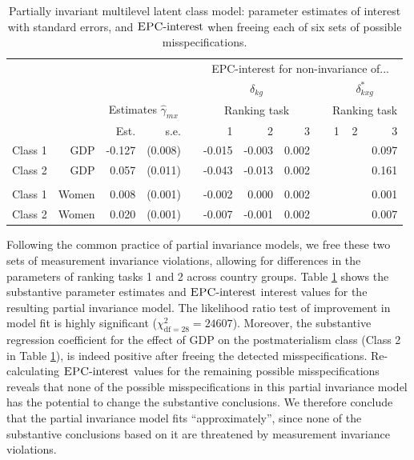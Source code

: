 \documentclass[letterpaper,12pt]{article}
\newcommand{\da}{\textrm{{\sc {EPC}}-interest}}
\begin{document}
\begin{table}\begin{small}
	\caption{
	Partially invariant  multilevel latent class model: parameter estimates of interest with standard errors, and  $\da{}$ when freeing each of six sets of possible misspecifications. 
	\label{tab:epc-interest-model2}}
	\begin{tabular}{lrrrrrrrrrrr}
	\hline
		&&&&&\multicolumn{7}{c}{EPC-interest for non-invariance of...}\\
	&&&&&\multicolumn{3}{c}{$\delta_{k g}$} && \multicolumn{3}{c}{$\delta^{*}_{k x g}$}\\
			\hline
		&&\multicolumn{2}{c}{Estimates $\hat{\gamma}_{mx}$}&&\multicolumn{3}{c}{Ranking task} && \multicolumn{3}{c}{Ranking task}\\
\cline{3-4}\cline{6-8}\cline{10-12}
			&	&	Est.&	s.e.&	&	1  &	2  &	3  &&	  1&	2 &	3\\
				\hline
Class 1&	GDP&	-0.127&	(0.008)&	&	-0.015&	-0.003&	0.002&&	&	&	0.097\\
Class 2&	GDP&	0.057&	(0.011)&	&	-0.043&	-0.013&	0.002&&	&	&	0.161\\
\\
Class 	1&	Women&	0.008&	(0.001)&	&	-0.002&	0.000&	0.002&	&&	&	0.001\\
Class 	2&	Women&	0.020&	(0.001)&	&	-0.007&	-0.001&	0.002&	&&	&	0.007\\
\hline
	\end{tabular}
\end{small}\end{table}

Following the common practice of partial invariance models, we free these two sets of measurement invariance violations, allowing for differences in the parameters of ranking tasks 1 and 2 across country groups. Table \ref{tab:epc-interest-model2} shows the substantive parameter estimates and $\da{}$ interest values for the resulting partial invariance model. The likelihood ratio test of improvement in model fit is highly significant ($\chi^2_{\text{df} = 28} = 24607$). Moreover, the substantive  regression coefficient for the effect of GDP on the postmaterialism class (Class 2 in Table \ref{tab:epc-interest-model2}), is indeed positive after freeing the detected misspecifications. Re-calculating $\da{}$ values for the remaining possible misspecifications reveals that none of the possible misspecifications in this partial invariance model has the potential to change the substantive conclusions. We therefore conclude that the partial invariance model fits ``approximately'', since none of the substantive conclusions based on it are threatened by measurement invariance violations.
\end{document}
